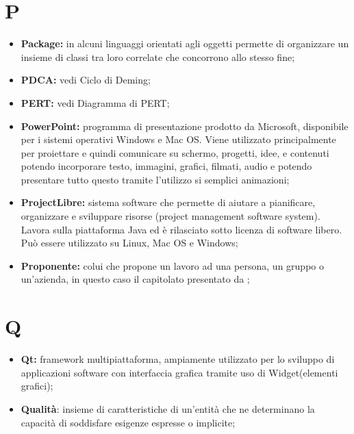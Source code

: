 %


\section*{P} %
\label{sec:p}
	\begin{itemize}
		\item \textbf{Package:} in alcuni linguaggi orientati agli oggetti permette di organizzare un insieme di classi tra loro correlate che concorrono allo stesso fine;
		\item \textbf{PDCA:} vedi Ciclo di Deming;		
		\item \textbf{PERT:} vedi Diagramma di PERT;		
		\item \textbf{PowerPoint:} programma di presentazione prodotto da Microsoft, disponibile per i sistemi operativi Windows e Mac OS. Viene utilizzato principalmente per proiettare e quindi comunicare su schermo, progetti, idee, e contenuti potendo incorporare testo, immagini, grafici, filmati, audio e potendo presentare tutto questo tramite l'utilizzo si semplici animazioni;
		\item \textbf{ProjectLibre:} sistema software che permette di aiutare a pianificare, organizzare e sviluppare risorse (project management software system). Lavora sulla piattaforma Java ed è rilasciato sotto licenza di software libero. Può essere utilizzato su Linux, Mac OS e Windows;		
		\item \textbf{Proponente:} colui che propone un lavoro ad una persona, un gruppo o un'azienda, in questo caso il capitolato presentato da \proposerName;
	\end{itemize}
\pagebreak

\section*{Q} %
\label{sec:q}
	\begin{itemize}
		\item \textbf{Qt:} framework multipiattaforma, ampiamente utilizzato per lo sviluppo di applicazioni software con interfaccia grafica tramite uso di Widget(elementi grafici);
		\item \textbf{Qualità}: insieme di caratteristiche di un'entità che ne determinano la capacità di soddisfare esigenze espresse o implicite;	
	\end{itemize}
\pagebreak

